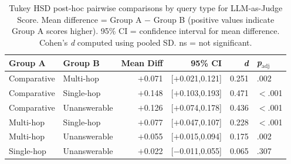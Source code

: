 \documentclass[12pt]{article}
\begin{document}
\begin{table}[h]
\centering
\caption{Tukey HSD post-hoc pairwise comparisons by query type for LLM-as-Judge Score. Mean difference = Group A $-$ Group B (positive values indicate Group A scores higher). 95\% CI = confidence interval for mean difference. Cohen's \textit{d} computed using pooled SD. ns = not significant.}
\label{tab:tukey_querytype}
\begin{tabular}{llrrrl}
\toprule
\textbf{Group A} & \textbf{Group B} & \textbf{Mean Diff} & \textbf{95\% CI} & \textbf{\textit{d}} & \textbf{\textit{p}$_{\text{adj}}$} \\
\midrule
Comparative & Multi-hop    & $+$0.071 & [$+$0.021,\hphantom{$+$}0.121] & 0.251 & .002 \\
Comparative & Single-hop   & $+$0.148 & [$+$0.103,\hphantom{$+$}0.193] & 0.471 & $<$.001 \\
Comparative & Unanswerable & $+$0.126 & [$+$0.074,\hphantom{$+$}0.178] & 0.436 & $<$.001 \\
Multi-hop   & Single-hop   & $+$0.077 & [$+$0.047,\hphantom{$+$}0.107] & 0.228 & $<$.001 \\
Multi-hop   & Unanswerable & $+$0.055 & [$+$0.015,\hphantom{$+$}0.094] & 0.175 & .002 \\
Single-hop  & Unanswerable & $+$0.022 & [$-$0.011,\hphantom{$+$}0.055] & 0.065 & .307 \\
\bottomrule
\end{tabular}
\end{table}
 
\end{document}
